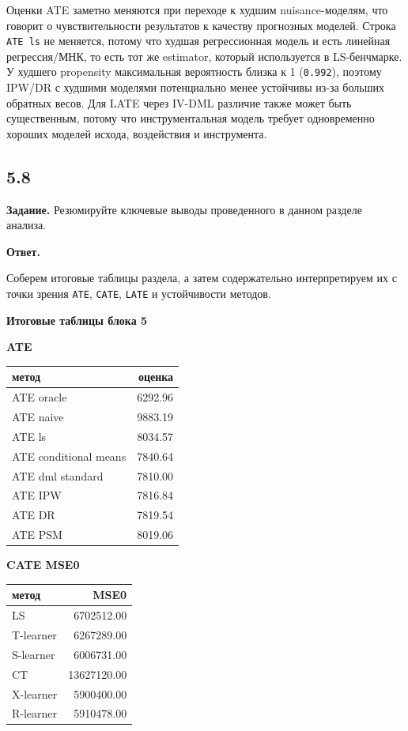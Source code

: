 \documentclass[11pt]{article}
\newcounter{none}
\begin{document}
    Оценки ATE заметно меняются при переходе к худшим nuisance-моделям, что
говорит о чувствительности результатов к качеству прогнозных моделей.
Строка \texttt{ATE\ ls} не меняется, потому что худшая регрессионная
модель и есть линейная регрессия/МНК, то есть тот же estimator, который
используется в LS-бенчмарке. У худшего propensity максимальная
вероятность близка к 1 (\texttt{0.992}), поэтому IPW/DR с худшими
моделями потенциально менее устойчивы из-за больших обратных весов. Для
LATE через IV-DML различие также может быть существенным, потому что
инструментальная модель требует одновременно хороших моделей исхода,
воздействия и инструмента.

    \subsection{5.8}\label{section}

\textbf{Задание.} Резюмируйте ключевые выводы проведенного в данном
разделе анализа.

\textbf{Ответ.}

Соберем итоговые таблицы раздела, а затем содержательно интерпретируем
их с точки зрения \texttt{ATE}, \texttt{CATE}, \texttt{LATE} и
устойчивости методов.

    \textbf{Итоговые таблицы блока 5}

\textbf{ATE}

{\def\LTcaptype{none} %
\begin{longtable}[]{@{}lr@{}}
\toprule\noalign{}
метод & оценка \\
\midrule\noalign{}
\endhead
\bottomrule\noalign{}
\endlastfoot
ATE oracle & 6292.96 \\
ATE naive & 9883.19 \\
ATE ls & 8034.57 \\
ATE conditional means & 7840.64 \\
ATE dml standard & 7810.00 \\
ATE IPW & 7816.84 \\
ATE DR & 7819.54 \\
ATE PSM & 8019.06 \\
\end{longtable}
}

\textbf{CATE MSE0}

{\def\LTcaptype{none} %
\begin{longtable}[]{@{}lr@{}}
\toprule\noalign{}
метод & MSE0 \\
\midrule\noalign{}
\endhead
\bottomrule\noalign{}
\endlastfoot
LS & 6702512.00 \\
T-learner & 6267289.00 \\
S-learner & 6006731.00 \\
CT & 13627120.00 \\
X-learner & 5900400.00 \\
R-learner & 5910478.00 \\
\end{longtable}
}
\end{document}
